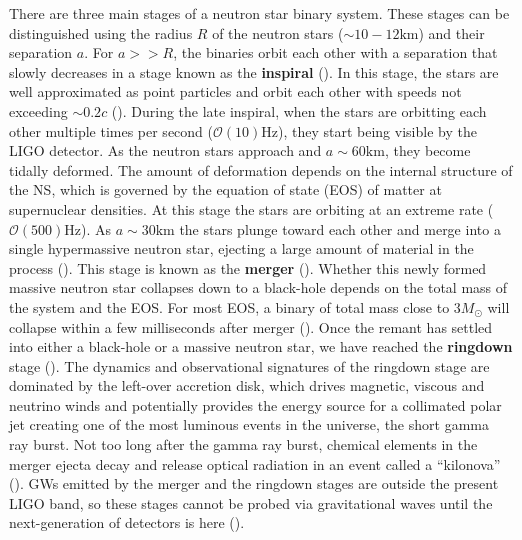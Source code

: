 There are three main stages of a neutron star binary system. These stages can be distinguished using the radius $R$ of the neutron stars ($\sim 10-12 \text{km}$) and their separation $a$. For $a >> R$, the binaries orbit each other with a separation that slowly decreases in a stage known as the \textbf{inspiral} (\citet*{faber2012binary,baumgarte2010numerical,shibata2015numerical,rezzolla2013relativistic}). In this stage, the stars are well approximated as point particles and orbit each other with speeds not exceeding $\sim 0.2c$ (\citet*{shibata2015numerical}). During the late inspiral, when the stars are orbitting each other multiple times per second ($\mathcal{O}(10) \text{Hz}$), they start being visible by the LIGO detector. As the neutron stars approach and $a\sim 60 \text{km}$, they become tidally deformed. The amount of deformation depends on the internal structure of the NS, which is governed by the equation of state (EOS) of matter at supernuclear densities. At this stage the stars are orbiting at an extreme rate ($\mathcal{O}(500) \text{Hz}$). As $a \sim 30 \text{km}$ the stars plunge toward each other and merge into a single hypermassive neutron star, ejecting a large amount of material in the process (\citet*{shibata2015numerical}). This stage is known as the \textbf{merger} (\citet*{faber2012binary,baumgarte2010numerical,shibata2015numerical,rezzolla2013relativistic}). Whether this newly formed massive neutron star collapses down to a black-hole depends on the total mass of the system and the EOS. For most EOS, a binary of total mass close to $3M_\odot$ will collapse within a few milliseconds after merger (\citet*{bauswein2013prompt}). Once the remant has settled into either a black-hole or a massive neutron star, we have reached the \textbf{ringdown} stage (\citet*{faber2012binary,baumgarte2010numerical,shibata2015numerical,rezzolla2013relativistic}). The dynamics and observational signatures of the ringdown stage are dominated by the left-over accretion disk, which drives magnetic, viscous and neutrino winds and potentially provides the energy source for a collimated polar jet creating one of the most luminous events in the universe, the short gamma ray burst. Not too long after the gamma ray burst, chemical elements in the merger ejecta decay and release optical radiation in an event called a ``kilonova'' (\citet*{metzger:16}). GWs emitted by the merger and the ringdown stages are outside the present LIGO band, so these stages cannot be probed via gravitational waves until the next-generation of detectors is here (\citet*{Abbott:2017dke}).

